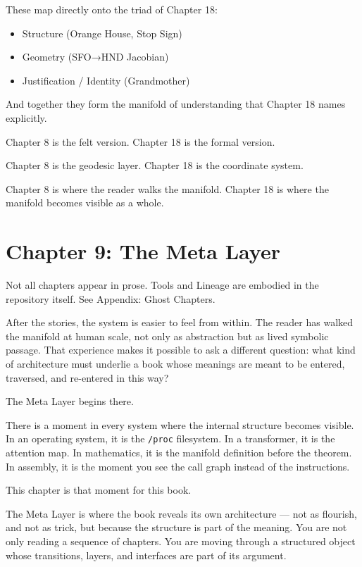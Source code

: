 These map directly onto the triad of Chapter 18:

\begin{itemize}
\tightlist
\item
  Structure (Orange House, Stop Sign)
\item
  Geometry (SFO→HND Jacobian)
\item
  Justification / Identity (Grandmother)
\end{itemize}

And together they form the manifold of understanding that Chapter 18
names explicitly.

Chapter 8 is the felt version. Chapter 18 is the formal version.

Chapter 8 is the geodesic layer. Chapter 18 is the coordinate system.

Chapter 8 is where the reader walks the manifold. Chapter 18 is where
the manifold becomes visible as a whole.

\newpage
\vspace*{3cm}

\hypertarget{chapter-9-the-meta-layer}{%
\section{Chapter 9: The Meta Layer}\label{chapter-9-the-meta-layer}}

Not all chapters appear in prose. Tools and Lineage are embodied in the
repository itself. See Appendix: Ghost Chapters.

After the stories, the system is easier to feel from within. The reader
has walked the manifold at human scale, not only as abstraction but as
lived symbolic passage. That experience makes it possible to ask a
different question: what kind of architecture must underlie a book whose
meanings are meant to be entered, traversed, and re-entered in this way?

The Meta Layer begins there.

There is a moment in every system where the internal structure becomes
visible. In an operating system, it is the \texttt{/proc} filesystem. In
a transformer, it is the attention map. In mathematics, it is the
manifold definition before the theorem. In assembly, it is the moment
you see the call graph instead of the instructions.

This chapter is that moment for this book.

The Meta Layer is where the book reveals its own architecture --- not as
flourish, and not as trick, but because the structure is part of the
meaning. You are not only reading a sequence of chapters. You are moving
through a structured object whose transitions, layers, and interfaces
are part of its argument.

